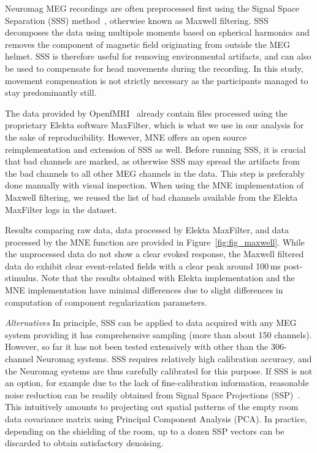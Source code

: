 Neuromag MEG recordings are often preprocessed first using the Signal Space Separation (SSS) method~\citep{taulu2006spatiotemporal}, otherwise known as Maxwell filtering. SSS decomposes the data using multipole moments based on spherical harmonics and removes the component of magnetic field originating from outside the MEG helmet. SSS is therefore useful for removing environmental artifacts, and can also be used to compensate for head movements during the recording. In this study, movement compensation is not strictly necessary as the participants managed to stay predominantly still.

The data provided by OpenfMRI~\citep{poldrack2017openfmri} already contain files processed using the proprietary Elekta software MaxFilter, which is what we use in our analysis for the sake of reproducibility. However, MNE offers an open source reimplementation and extension of SSS as well. Before running SSS, it is crucial that bad channels are marked, as otherwise SSS may spread the artifacts from the bad channels to all other MEG channels in the data. This step is preferably done manually with visual inspection. When using the MNE implementation of Maxwell filtering, we reused the list of bad channels available from the Elekta MaxFilter logs in the dataset.

Results comparing raw data, data processed by Elekta MaxFilter, and data processed by the MNE  function are provided in Figure~\ref{fig:fig_maxwell}. While the unprocessed data do not show a clear evoked response, the Maxwell filtered data do exhibit clear event-related fields with a clear peak around 100\,ms post-stimulus. Note that the results obtained with Elekta implementation and the MNE implementation have minimal differences due to slight differences in computation of component regularization parameters.

\emph{Alternatives} In principle, SSS can be applied to data acquired with any MEG system providing it has comprehensive sampling (more than  about 150 channels). However, so far it has not been tested extensively with other than the 306-channel Neuromag systems. SSS requires relatively high calibration accuracy, and the Neuromag systems are thus carefully calibrated for this purpose. If SSS is not an option, for example due to the lack of fine-calibration information, reasonable noise reduction can be readily obtained from Signal Space Projections (SSP)~\citep{ssp}. This intuitively amounts to projecting out spatial patterns of the empty room data covariance matrix using Principal Component Analysis (PCA). In practice, depending on the shielding of the room, up to a dozen SSP vectors can be discarded to obtain satisfactory denoising.

